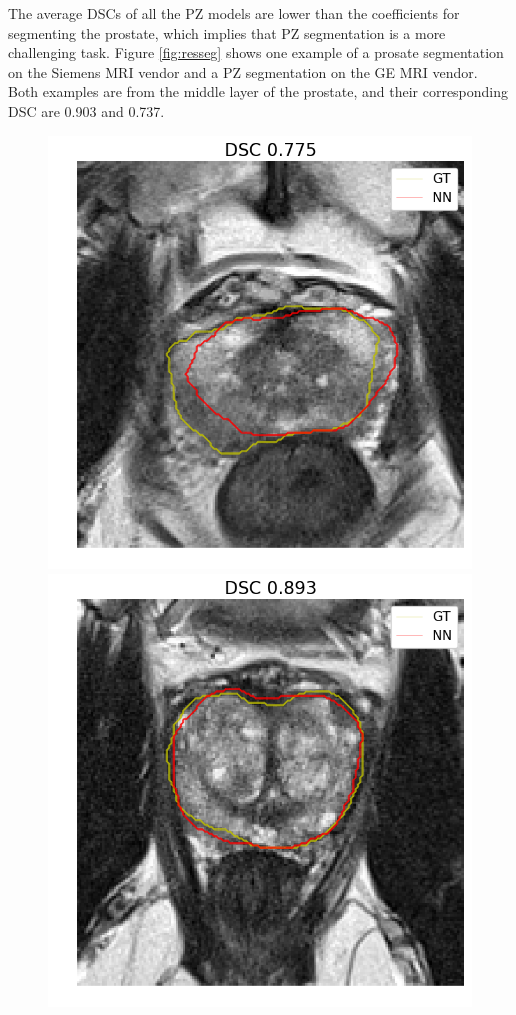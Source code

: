 The average DSCs of all the PZ models are lower than the coefficients for segmenting the prostate, which implies that PZ segmentation is a more challenging task.
Figure \ref{fig:resseg} shows one example of a prosate segmentation on the Siemens MRI vendor and a PZ segmentation on the GE MRI vendor. Both examples are from the middle layer of the prostate, and their corresponding DSC are 0.903 and 0.737.
 \begin{figure}[h]
    \centering
    \includegraphics[totalheight=.2\textheight]{figures/results/Prostate_Px_Challenge__P_yes_ROI_MIN_Case-0128.png}
    \includegraphics[totalheight=.2\textheight]{figures/results/Prostate_Px_Challenge__P_yes_ROI_MEAN_Case-0176.png}

\end{figure}
